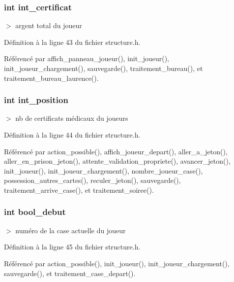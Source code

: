 \subsubsection{\setlength{\rightskip}{0pt plus 5cm}int {\bf int\_\-certificat}}\label{structjoueur_ecbece39087923f999df36d5107d3dee}


$>$ argent total du joueur 



D\'{e}finition \`{a} la ligne 43 du fichier structure.h.

R\'{e}f\'{e}renc\'{e} par affich\_\-panneau\_\-joueur(), init\_\-joueur(), init\_\-joueur\_\-chargement(), sauvegarde(), traitement\_\-bureau(), et traitement\_\-bureau\_\-laurence().
\subsubsection{\setlength{\rightskip}{0pt plus 5cm}int {\bf int\_\-position}}\label{structjoueur_47d7b57cd189c4324a0bc8b338aec618}


$>$ nb de certificats m\'{e}dicaux du joueurs 



D\'{e}finition \`{a} la ligne 44 du fichier structure.h.

R\'{e}f\'{e}renc\'{e} par action\_\-possible(), affich\_\-joueur\_\-depart(), aller\_\-a\_\-jeton(), aller\_\-en\_\-prison\_\-jeton(), attente\_\-validation\_\-propriete(), avancer\_\-jeton(), init\_\-joueur(), init\_\-joueur\_\-chargement(), nombre\_\-joueur\_\-case(), possession\_\-autres\_\-cartes(), reculer\_\-jeton(), sauvegarde(), traitement\_\-arrive\_\-case(), et traitement\_\-soiree().
\subsubsection{\setlength{\rightskip}{0pt plus 5cm}int {\bf bool\_\-debut}}\label{structjoueur_3007bbdde3256a72f4c1980d73f400e1}


$>$ num\'{e}ro de la case actuelle du joueur 



D\'{e}finition \`{a} la ligne 45 du fichier structure.h.

R\'{e}f\'{e}renc\'{e} par action\_\-possible(), init\_\-joueur(), init\_\-joueur\_\-chargement(), sauvegarde(), et traitement\_\-case\_\-depart().
